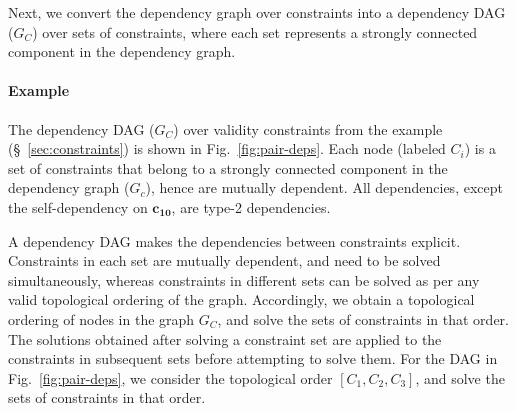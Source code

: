 Next, we convert the dependency graph over constraints into a
dependency DAG ($G_C$) over sets of constraints, where each set
represents a strongly connected component in the dependency graph.

\paragraph{Example} The dependency DAG ($G_C$) over validity
constraints from the  example (\S~\ref{sec:constraints}) is
shown in Fig.~\ref{fig:pair-deps}. Each node (labeled $C_i$) is a set
of constraints that belong to a strongly connected component in the
dependency graph ($G_c$), hence are mutually dependent. All
dependencies, except the self-dependency on $\mathbf{c_{10}}$, are
type-2 dependencies.

A dependency DAG makes the dependencies between constraints explicit.
Constraints in each set are mutually dependent, and need to be solved
simultaneously, whereas constraints in different sets can be solved as
per any valid topological ordering of the graph. Accordingly, we
obtain a topological ordering of nodes in the graph $G_{{C}}$, and
solve the sets of constraints in that order. The solutions obtained
after solving a constraint set are applied to the constraints in
subsequent sets before attempting to solve them. For the DAG in
Fig.~\ref{fig:pair-deps}, we consider the topological order $[C_1,
C_2, C_3]$, and solve the sets of constraints in that order.

